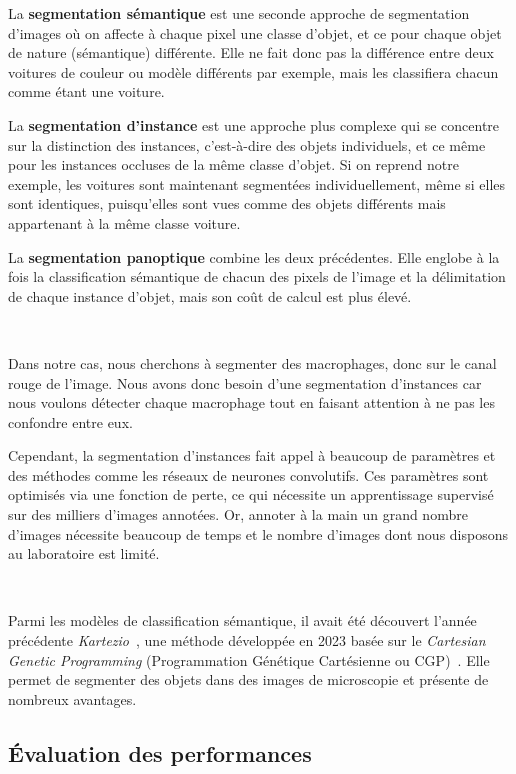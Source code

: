 \documentclass[a4paper,12pt]{report}
\begin{document}
La \textbf{segmentation sémantique} est une seconde approche de segmentation d'images où on affecte à chaque pixel une classe d'objet, et ce pour chaque objet de nature (sémantique) différente. Elle ne fait donc pas la différence entre deux voitures de couleur ou modèle différents par exemple, mais les classifiera chacun comme étant une voiture.

La \textbf{segmentation d'instance} est une approche plus complexe qui se concentre sur la distinction des instances, c'est-à-dire des objets individuels, et ce même pour les instances occluses de la même classe d'objet. Si on reprend notre exemple, les voitures sont maintenant segmentées individuellement, même si elles sont identiques, puisqu'elles sont vues comme des objets différents mais appartenant à la même classe \og voiture\fg.

La \textbf{segmentation panoptique} combine les deux précédentes. Elle englobe à la fois la classification sémantique de chacun des pixels de l'image et la délimitation de chaque instance d'objet, mais son coût de calcul est plus élevé.

\

Dans notre cas, nous cherchons à segmenter des macrophages, donc sur le canal rouge de l'image. Nous avons donc besoin d'une segmentation d'instances car nous voulons détecter chaque macrophage tout en faisant attention à ne pas les confondre entre eux.

Cependant, la segmentation d'instances fait appel à beaucoup de paramètres et des méthodes comme les réseaux de neurones convolutifs. Ces paramètres sont optimisés via une fonction de perte, ce qui nécessite un apprentissage supervisé sur des milliers d'images annotées. Or, annoter à la main un grand nombre d'images nécessite beaucoup de temps et le nombre d'images dont nous disposons au laboratoire est limité.



\

Parmi les modèles de classification sémantique, il avait été découvert l'année précédente \textit{Kartezio}~\cite{kartezio}, une méthode développée en 2023 basée sur le \textit{Cartesian Genetic Programming} (Programmation Génétique Cartésienne ou CGP)~\cite{cgp}. Elle permet de segmenter des objets dans des images de microscopie et présente de nombreux avantages.







\subsection{Évaluation des performances}\label{evalperf}
\end{document}
